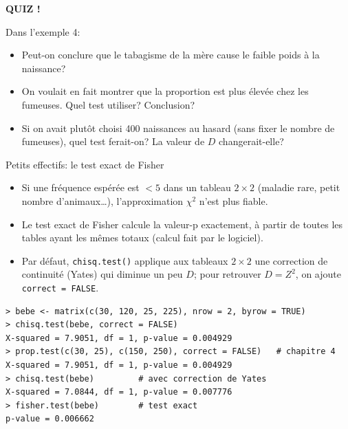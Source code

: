 \documentclass{BeamerTemplate}
\begin{document}
\begin{frame}[plain,t]
  \centerline{\LARGE\bfseries\alert{QUIZ !}}

  \medskip
  Dans l'exemple 4:
  \begin{itemize}\itemsep 1.2cm
    \item Peut-on conclure que le tabagisme de la mère \alert{cause} le faible
    poids à la naissance?
    \item<2-> On voulait en fait montrer que la proportion est \alert{plus élevée}
    chez les fumeuses. Quel test utiliser? Conclusion?
    \item<3-> Si on avait plutôt choisi 400 naissances au hasard (sans fixer
    le nombre de fumeuses), quel test ferait-on? La valeur de $D$
    changerait-elle?
  \end{itemize}
\end{frame}

\begin{frame}[fragile,t]{Petits effectifs: le test exact de Fisher}

\footnotesize
\begin{itemize}\itemsep1mm
  \item Si une fréquence espérée est $<5$ dans un tableau $2\times2$ (maladie
  rare, petit nombre d'animaux\ldots), l'approximation $\chi^2$ n'est plus fiable.
  \item Le \alert{test exact de Fisher} calcule la valeur-p exactement, à partir de
  toutes les tables ayant les mêmes totaux (calcul fait par le logiciel).
  \item Par défaut, \texttt{chisq.test()} applique aux tableaux $2\times2$ une
  \alert{correction de continuité} (Yates) qui diminue un peu $D$; pour retrouver
  $D=Z^2$, on ajoute \texttt{correct = FALSE}.
\end{itemize}

\begin{Verbatim}[fontsize=\scriptsize]
> bebe <- matrix(c(30, 120, 25, 225), nrow = 2, byrow = TRUE)
> chisq.test(bebe, correct = FALSE)
X-squared = 7.9051, df = 1, p-value = 0.004929
> prop.test(c(30, 25), c(150, 250), correct = FALSE)   # chapitre 4
X-squared = 7.9051, df = 1, p-value = 0.004929
> chisq.test(bebe)         # avec correction de Yates
X-squared = 7.0844, df = 1, p-value = 0.007776
> fisher.test(bebe)        # test exact
p-value = 0.006662
\end{Verbatim}

\end{frame}

\end{document}
